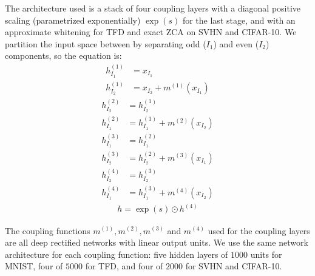 \documentclass{article}
\begin{document}
The architecture used is a stack of four coupling layers with a diagonal
positive scaling (parametrized exponentially) $\exp(s)$ for the last stage, and with an approximate
whitening for TFD and exact ZCA on SVHN and CIFAR-10.
We partition the input space between by separating odd ($I_{1}$) and even ($I_{2}$)
components, so the equation is:
\begin{align*}
h^{(1)}_{I_{1}} &= x_{I_{1}}\\
h^{(1)}_{I_{2}} &= x_{I_{2}} + m^{(1)}(x_{I_{1}})
\end{align*}
\begin{align*}
h^{(2)}_{I_{2}} &= h^{(1)}_{I_{2}}\\
h^{(2)}_{I_{1}} &= h^{(1)}_{I_{1}} + m^{(2)}(x_{I_{2}})
\end{align*}
\begin{align*}
h^{(3)}_{I_{1}} &= h^{(2)}_{I_{1}}\\
h^{(3)}_{I_{2}} &= h^{(2)}_{I_{2}} + m^{(3)}(x_{I_{1}})
\end{align*}
\begin{align*}
h^{(4)}_{I_{2}} &= h^{(3)}_{I_{2}}\\
h^{(4)}_{I_{1}} &= h^{(3)}_{I_{1}} + m^{(4)}(x_{I_{2}})
\end{align*}
\begin{align*}
h = \exp(s) \odot h^{(4)}
\end{align*}

The coupling functions $m^{(1)}, m^{(2)}, m^{(3)}$ and $m^{(4)}$ used
for the coupling layers are all deep rectified networks
with linear output units.  We use the same network architecture for each coupling function: five hidden layers of $1000$ units for MNIST,
four of $5000$ for TFD, and four of $2000$ for SVHN and CIFAR-10. 
%
\end{document}
